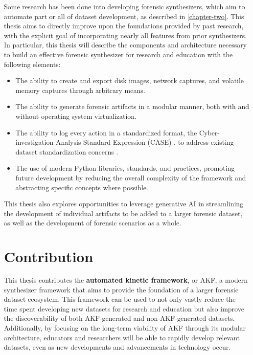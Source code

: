 \documentclass[letterpaper,12pt]{report}
\def\tightlist{}
\begin{document}
Some research has been done into developing forensic synthesizers, which
aim to automate part or all of dataset development, as described in
\autoref{chapter-two}. This thesis aims to directly improve
upon the foundations provided by past research, with the explicit goal
of incorporating nearly all features from prior synthesizers. In
particular, this thesis will describe the components and architecture
necessary to build an effective forensic synthesizer for research and
education with the following elements:

\begin{itemize}
\tightlist
\item
  The ability to create and export disk images, network captures, and
  volatile memory captures through arbitrary means.
\item
  The ability to generate forensic artifacts in a modular manner, both
  with and without operating system virtualization.
\item
  The ability to log every action in a standardized format, the
  Cyber-investigation Analysis Standard Expression (CASE)
  \cite{caseyAdvancingCoordinatedCyberinvestigations2017}, to
  address existing dataset standardization concerns
  \cite{horsmanDatasetConstructionChallenges2021}.
\item
  The use of modern Python libraries, standards, and practices,
  promoting future development by reducing the overall complexity of the
  framework and abstracting specific concepts where possible.
\end{itemize}

This thesis also explores opportunities to leverage generative AI in
streamlining the development of individual artifacts to be added to a
larger forensic dataset, as well as the development of forensic
scenarios as a whole.

\section{Contribution}\label{contribution}

This thesis contributes the \textbf{automated kinetic framework}, or
AKF, a modern synthesizer framework that aims to provide the foundation
of a larger forensic dataset ecosystem. This framework can be used to
not only vastly reduce the time spent developing new datasets for
research and education but also improve the discoverability of both
AKF-generated and non-AKF-generated datasets. Additionally, by focusing
on the long-term viability of AKF through its modular architecture,
educators and researchers will be able to rapidly develop relevant
datasets, even as new developments and advancements in technology occur.
\end{document}
